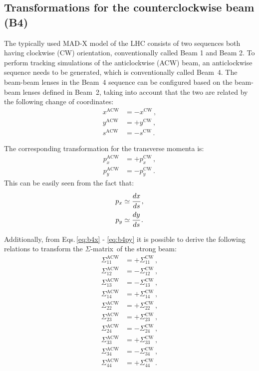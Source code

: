 \subsection{Transformations for the counterclockwise beam (B4)}
\label{sec:b4}

The typically used MAD-X model of the LHC consists of two sequences both having clockwise (CW) orientation, conventionally called Beam 1 and Beam 2. To perform tracking simulations of the anticlockwise (ACW) beam, an anticlockwise sequence needs to be generated, which is conventionally called Beam~4. The beam-beam lenses in the Beam~4 sequence can be configured based on the beam-beam lenses defined in Beam~2, taking into account that the two are related by the following change of coordinates:
\begin{align}
    x^\text{ACW} &= -x^\text{CW} \, , \label{eq:b4x}\\
    y^\text{ACW} &= +y^\text{CW} \, , \\
    s^\text{ACW} &= -s^\text{CW} \, .
\end{align}

The corresponding transformation for the transverse momenta is:
\begin{align}
    p_x^\text{ACW} &= +p_x^\text{CW} \, ,\\
    p_y^\text{ACW} &= -p_y^\text{CW} \, .\label{eq:b4py}
\end{align}
This can be easily seen from the fact that:
\begin{align}
    p_x &\simeq \cfrac{dx}{ds} \, ,\\
    p_y &\simeq \cfrac{dy}{ds} \, .
\end{align}

Additionally, from Eqs.\,\eqref{eq:b4x} - \eqref{eq:b4py} it is possible to derive the following relations to transform the $\Sigma$-matrix\,\cite{bb6dnote} of the strong beam:
\begin{align}
    \Sigma_{11}^\text{ACW} &= +\Sigma_{11}^\text{CW} \, ,\\
    \Sigma_{12}^\text{ACW} &= -\Sigma_{12}^\text{CW} \, ,\\
    \Sigma_{13}^\text{ACW} &= -\Sigma_{13}^\text{CW} \, ,\\
    \Sigma_{14}^\text{ACW} &= +\Sigma_{14}^\text{CW} \, ,\\
    \Sigma_{22}^\text{ACW} &= +\Sigma_{22}^\text{CW} \, ,\\
    \Sigma_{23}^\text{ACW} &= +\Sigma_{23}^\text{CW} \, ,\\
    \Sigma_{24}^\text{ACW} &= -\Sigma_{24}^\text{CW} \, ,\\
    \Sigma_{33}^\text{ACW} &= +\Sigma_{33}^\text{CW} \, ,\\
    \Sigma_{34}^\text{ACW} &= -\Sigma_{34}^\text{CW} \, ,\\
    \Sigma_{44}^\text{ACW} &= +\Sigma_{44}^\text{CW} \, .\\
\end{align}

